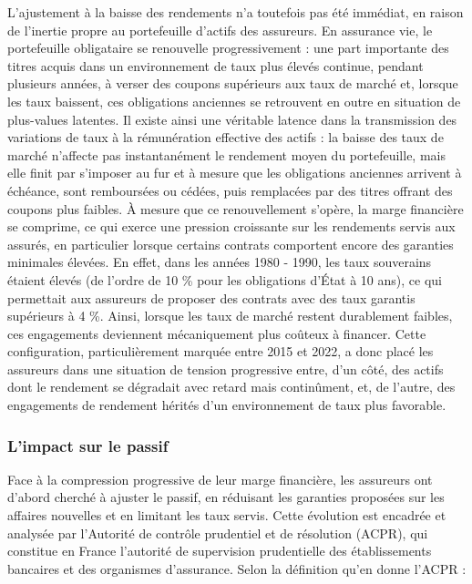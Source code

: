 L'ajustement à la baisse des rendements n'a toutefois pas été immédiat, en raison de l'inertie propre au portefeuille d'actifs des assureurs. En assurance vie, le portefeuille obligataire se renouvelle progressivement : une part importante des titres acquis dans un environnement de taux plus élevés continue, pendant plusieurs années, à verser des coupons supérieurs aux taux de marché et, lorsque les taux baissent, ces obligations anciennes se retrouvent en outre en situation de plus-values latentes. Il existe ainsi une véritable latence dans la transmission des variations de taux à la rémunération effective des actifs : la baisse des taux de marché n'affecte pas instantanément le rendement moyen du portefeuille, mais elle finit par s'imposer au fur et à mesure que les obligations anciennes arrivent à échéance, sont remboursées ou cédées, puis remplacées par des titres offrant des coupons plus faibles. À mesure que ce renouvellement s'opère, la marge financière se comprime, ce qui exerce une pression croissante sur les rendements servis aux assurés, en particulier lorsque certains contrats comportent encore des garanties minimales élevées. En effet, dans les années 1980 - 1990, les taux souverains étaient élevés (de l'ordre de 10 \% pour les obligations d'État à 10 ans), ce qui permettait aux assureurs de proposer des contrats avec des taux garantis supérieurs à 4 \%. Ainsi, lorsque les taux de marché restent durablement faibles, ces engagements deviennent mécaniquement plus coûteux à financer. Cette configuration, particulièrement marquée entre 2015 et 2022, a donc placé les assureurs dans une situation de tension progressive entre, d'un côté, des actifs dont le rendement se dégradait avec retard mais continûment, et, de l'autre, des engagements de rendement hérités d'un environnement de taux plus favorable.

\subsubsection{L'impact sur le passif}

Face à la compression progressive de leur marge financière, les assureurs ont d'abord cherché à ajuster le passif, en réduisant les garanties proposées sur les affaires nouvelles et en limitant les taux servis. Cette évolution est encadrée et analysée par l'Autorité de contrôle prudentiel et de résolution (ACPR), qui constitue en France l'autorité de supervision prudentielle des établissements bancaires et des organismes d'assurance. Selon la définition qu'en donne l'ACPR \cite{taux_interet_technique} :

